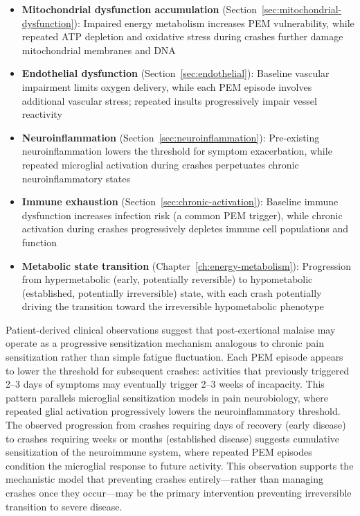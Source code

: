 \begin{itemize}
    \item \textbf{Mitochondrial dysfunction accumulation} (Section~\ref{sec:mitochondrial-dysfunction}): Impaired energy metabolism increases PEM vulnerability, while repeated ATP depletion and oxidative stress during crashes further damage mitochondrial membranes and DNA
    \item \textbf{Endothelial dysfunction} (Section~\ref{sec:endothelial}): Baseline vascular impairment limits oxygen delivery, while each PEM episode involves additional vascular stress; repeated insults progressively impair vessel reactivity
    \item \textbf{Neuroinflammation} (Section~\ref{sec:neuroinflammation}): Pre-existing neuroinflammation lowers the threshold for symptom exacerbation, while repeated microglial activation during crashes perpetuates chronic neuroinflammatory states
    \item \textbf{Immune exhaustion} (Section~\ref{sec:chronic-activation}): Baseline immune dysfunction increases infection risk (a common PEM trigger), while chronic activation during crashes progressively depletes immune cell populations and function
    \item \textbf{Metabolic state transition} (Chapter~\ref{ch:energy-metabolism}): Progression from hypermetabolic (early, potentially reversible) to hypometabolic (established, potentially irreversible) state, with each crash potentially driving the transition toward the irreversible hypometabolic phenotype
\end{itemize}

\begin{observation}
\label{obs:pem-sensitization-mechanism}
Patient-derived clinical observations suggest that post-exertional malaise may operate as a progressive sensitization mechanism analogous to chronic pain sensitization rather than simple fatigue fluctuation. Each PEM episode appears to lower the threshold for subsequent crashes: activities that previously triggered 2--3 days of symptoms may eventually trigger 2--3 weeks of incapacity. This pattern parallels microglial sensitization models in pain neurobiology, where repeated glial activation progressively lowers the neuroinflammatory threshold. The observed progression from crashes requiring days of recovery (early disease) to crashes requiring weeks or months (established disease) suggests cumulative sensitization of the neuroimmune system, where repeated PEM episodes condition the microglial response to future activity. This observation supports the mechanistic model that preventing crashes entirely---rather than managing crashes once they occur---may be the primary intervention preventing irreversible transition to severe disease.
\end{observation}

